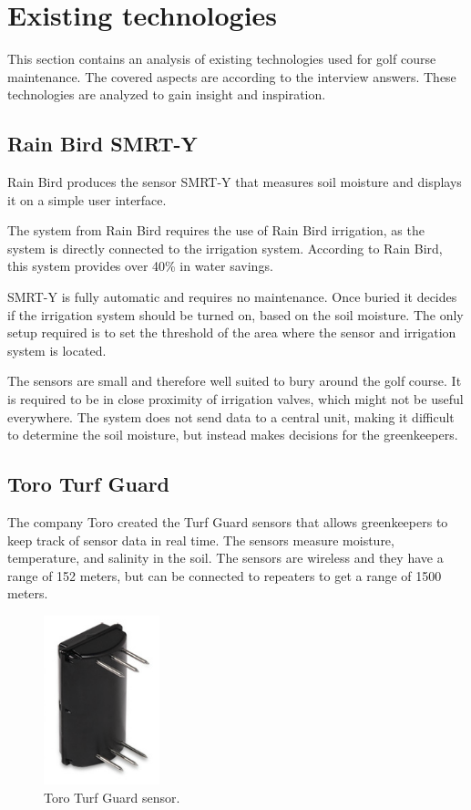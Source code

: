 \section{Existing technologies}
This section contains an analysis of existing technologies used for golf course maintenance. The covered aspects are according to the interview answers. These technologies are analyzed to gain insight and inspiration.

\subsection{Rain Bird SMRT-Y}
Rain Bird produces the sensor SMRT-Y that measures soil moisture and displays it on a simple user interface\cite{smrty}.

The system from Rain Bird requires the use of Rain Bird irrigation, as the system is directly connected to the irrigation system. 
According to Rain Bird, this system provides over 40\% in water savings\cite{smrty2}.

SMRT-Y is fully automatic and requires no maintenance. Once buried it decides if the irrigation system should be turned on, based on the soil moisture. 
The only setup required is to set the threshold of the area where the sensor and irrigation system is located\cite{smrty2}.

The sensors are small and therefore well suited to bury around the golf course. It is required to be in close proximity of irrigation valves, which might not be useful everywhere.
The system does not send data to a central unit, making it difficult to  determine the soil moisture, but instead makes decisions for the greenkeepers. 

\subsection{Toro Turf Guard\texttrademark{}}
The company Toro created the Turf Guard\texttrademark{} sensors that allows greenkeepers to keep track of sensor data in real time. The sensors measure moisture, temperature, and salinity in the soil\cite{turfGuard}.
The sensors are wireless and they have a range of 152 meters, but can be connected to repeaters to get a range of 1500 meters\cite{turfGuard}.

\begin{figure}
\begin{center}
\includegraphics[width=0.3\textwidth]{chapters/analysis/figs/Turfguard.png}
\caption{Toro Turf Guard\texttrademark{} sensor\cite{turfGuard2}.}
\label{fig:turfguard}
\end{center}
\end{figure}

